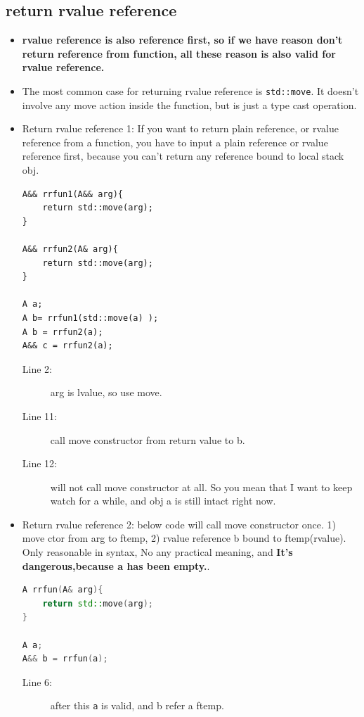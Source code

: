 \documentclass[a4paper,11pt,twoside]{book}
\begin{document}
\subsection{return rvalue reference}
\begin{itemize}
	\item \textbf{rvalue reference is also reference first, so if we have reason don't return reference from function, all these reason is also valid for rvalue reference.}
	
	\item The most common case for returning rvalue reference is \texttt{std::move}. It doesn't involve any move action inside the function, but is just a type cast operation.
	
	\item Return rvalue reference 1: If you want to return plain reference, or rvalue reference from a function, you have to input a plain reference or rvalue reference first, because you can't return any reference bound to local stack obj.
	
\begin{lstlisting}
A&& rrfun1(A&& arg){
	return std::move(arg);	
}
	
A&& rrfun2(A& arg){
	return std::move(arg);
}
	
A a;
A b= rrfun1(std::move(a) );
A b = rrfun2(a);
A&& c = rrfun2(a);
\end{lstlisting}
\begin{description}
	\item[Line 2:] arg is lvalue, so use move.
	\item[Line 11:] call move constructor from return value to b.
	\item[Line 12:] will not call move constructor at all. So you mean that I want to keep watch for a while, and obj a is still intact right now.
\end{description}
 
	\item Return rvalue reference 2:   below code will call move constructor once.  1) move ctor from arg to ftemp, 2) rvalue reference b bound to ftemp(rvalue). Only reasonable in syntax, No any practical meaning, and \textbf{It's dangerous,because a has been empty.}.
\begin{lstlisting}[frame=single, language=c++]
A rrfun(A& arg){
	return std::move(arg);
}
	
A a;
A&& b = rrfun(a);
\end{lstlisting}
\begin{description}
	\item[Line 6:] after this \texttt{a} is valid, and b refer a ftemp.
\end{description}
	

\end{itemize}
\end{document}
